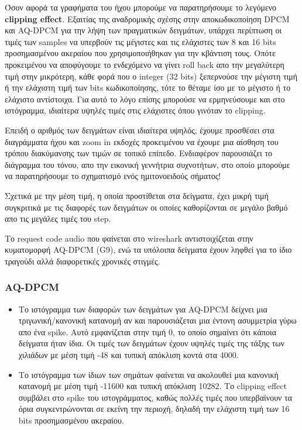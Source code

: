 \documentclass[hidelinks, 12pt, a4paper]{article}
\begin{document}
Όσον αφορά τα γραφήματα του ήχου μπορούμε να παρατηρήσουμε το λεγόμενο \textbf{clipping effect}. Εξαιτίας της αναδρομικής σχέσης στην αποκωδικοποίηση DPCM και AQ-DPCM για την λήψη των πραγματικών δειγμάτων, υπάρχει περίπτωση οι τιμές των samples να υπερβούν τις μέγιστες και τις ελάχιστες των 8 και 16 bits προσημασμένου ακεραίου που χρησιμοποιήθηκαν για την κβάντιση τους. Οπότε προκειμένου να αποφύγουμε το ενδεχόμενο να γίνει roll back απο την μεγαλύτερη τιμή στην μικρότερη, κάθε φορά που ο integer (32 bits) ξεπερνούσε την μέγιστη τιμή ή την ελάχιστη τιμή των bits κωδικοποίησης, τότε το θέταμε ίσο με το μέγιστο ή το ελάχιστο αντίστοιχα. Για αυτό το λόγο επίσης μπορούσε να ερμηνεύσουμε και στο ιστόγραμμα, ιδιαίτερα υψηλές τιμές στις ελάχιστες όπου γινόταν το clipping.

Επειδή ο αριθμός των δειγμάτων είναι ιδιαίτερα υψηλός, έχουμε προσθέσει στα διαγράμματα ήχου και zoom in εκδοχές προκειμένου να έχουμε μια αίσθηση του τρόπου διακύμανσης των τιμών σε τοπικό επίπεδο. Ενδιαφέρον παρουσιάζει το διάγραμμα του τόνου, απο την εικονική γεννήτρια συχνοτήτων, στο οποίο μπορούμε να παρατηρήσουμε το σχηματισμό ενός ημιτονοειδούς σήματος!

Σχετικά με την μέση τιμή, η οποία προστίθεται στα δείγματα, έχει μικρή τιμή συγκριτικά με τις διαφορές των δειγμάτων οι οποίες καθορίζονται σε μεγάλο βαθμό απο τις μεγάλες τιμές του step.

Το request code audio που φαίνεται στο wireshark αντιστοιχίζεται στην κυματομορφή AQ-DPCM (G9), ενώ τα υπόλοιπα δείγματα έχουν ληφθεί για το ίδιο τραγούδι αλλά διαφορετικές χρονικές στιγμές.

\subsubsection{AQ-DPCM}

\begin{itemize}
    \item Το ιστόγραμμα των διαφορών των δειγμάτων για AQ-DPCM δείχνει μια τριγωνική/κανονική κατανομή αν και παρουσιάζεται μια έντονη ασυμμετρία γύρω απο ένα spike. Αυτό εμφανίζεται στην τιμή 0, το οποίο σημαίνει ότι κάποια δείγματα ήταν ίδια. Οι τιμές των δειγμάτων έχουν υψηλές τιμές της τάξης των χιλιάδων με μέση τιμή -48 και τυπική απόκλιση κοντά στα 4000.
    \item Το ιστόγραμμα των ίδιων των σημάτων φαίνεται να ακολουθεί μια κανονική κατανομή με μέση τιμή -11600 και τυπική απόκλιση 10282. Το clipping effect συμβάλει στο spike του ιστογράμματος, καθώς πολλές τιμές που υπερβαίνουν τα όρια συγκεντρώνονται σε εκείνη την περιοχή, δηλαδή την ελάχιστη τιμή των 16 bits προσημασμένου ακεραίου.
\end{itemize}
\end{document}
